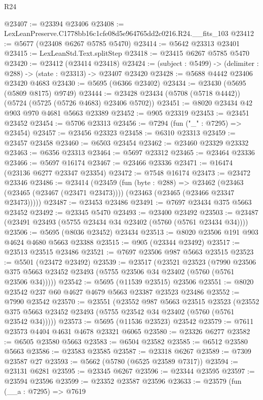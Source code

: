 \begin{lexlean}{R24}
\begin{coremodule}
@23407 := @23394 @23406
@23408 := LexLeanPreserve.C1778bb16c1cfe08d5e964765dd2c0216.R24.__fits_103
@23412 := @5677 (@23408 @6267 @5785 @5470)
@23414 := @5642 @23313 @23401
@23415 := LexLeanStd.Text.splitStep
@23418 := @23415 @6267 @5785 @5470
@23420 := @23412 (@23414 @23418)
@23424 := (subject : @5499) -> (delimiter : @288) -> (state : @23313) -> @23407 @23420
@23428 := @5688 @4442 @23406 @23420 @4683
@23430 := @5695 (@6366 @23402)
@23434 := @23430 (@5695 (@5809 @8175) @9749)
@23444 := @23428 @23434 (@5708 (@5718 @4442)) (@5724 (@5725 (@5726 @4683) @23406 @5702))
@23451 := @8020 @23434 @42 @903 @970 @4681 @5663 @23389
@23452 := @905 @23319
@23453 := @23451 @23452
@23454 := @5706 @23313
@23456 := @7294 (fun ("_" : @7295) => @23454)
@23457 := @23456 @23323
@23458 := @6310 @23313
@23459 := @23457 @23458
@23460 := @6503 @23454
@23462 := @23460 @23329 @23332
@23463 := @6356 @23313
@23464 := @5697 @23312
@23465 := @23464 @23336
@23466 := @5697 @16174
@23467 := @23466 @23336
@23471 := @16474 (@23136 @6277 @23347 @23354)
@23472 := @7548 @16174
@23473 := @23472 @23346
@23486 := @23414
    (@23459
      (fun (byte : @288) =>
      @23462 (@23463 (@23465 (@23467 (@23471 @23473)))) (@23463 (@23465 (@23466 @23347 @23473)))))
@23487 := @23453 @23486
@23491 := @7697 @23434 @375 @5663 @23452
@23492 := @23345 @5470
@23493 := @23400 @23492
@23503 := @23487 (@23491 @23493 (@5755 @23434 @34 @23402 (@5760 (@5761 @23434 @34))))
@23506 := @5695 (@8036 @23452) @23434
@23513 := @8020 @23506 @191 @903 @4624 @4680 @5663 @23388
@23515 := @905 (@23344 @23492)
@23517 := @23513 @23515 @23486
@23521 := @7697 @23506 @987 @5663 @23515
@23523 := @5501 (@23472 @23492)
@23539 := @23517
    (@23521
      @23523
      (@7990 @23506 @375 @5663 @23452 @23493 (@5755 @23506 @34 @23402 (@5760 (@5761 @23506 @34)))))
@23542 := @5695 (@11539 @23515) @23506
@23551 := @8020 @23542 @237 @60 @4627 @4679 @5663 @23387 @23523 @23486
@23552 := @7990 @23542
@23570 := @23551
    (@23552
      @987
      @5663
      @23515
      @23523
      (@23552 @375 @5663 @23452 @23493 (@5755 @23542 @34 @23402 (@5760 (@5761 @23542 @34)))))
@23573 := @5695 (@11536 @23523) @23542
@23579 := @7611 @23573 @4404 @4631 @4678 @23321 @6065
@23580 := @23326 @6277
@23582 := @6505 @23580 @5663
@23583 := @6504 @23582
@23585 := @6512 @23580 @5663
@23586 := @23583 @23585
@23587 := @23318 @6267
@23589 := @7309 @23587 @27
@23593 := @5662 (@5780 (@6525 @23589 @7317))
@23594 := @23131 @6281
@23595 := @23345 @6267
@23596 := @23344 @23595
@23597 := @23594 @23596
@23599 := @23352 @23587 @23596
@23633 := @23579
    (fun (__a : @7295) =>
    @7619

\end{coremodule}
\end{lexlean}

